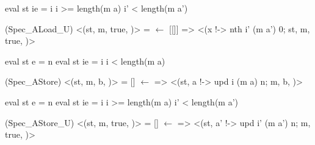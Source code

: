 \documentclass[12pt]{report}
\begin{document}
eval st ie = i   i >= length(m a)   i' < length(m a')
\par
\noindent\hrulefill\par
\noindent{} (Spec\_ALoad\_U)
  <(st, m, true,   )> =  \ensuremath{\leftarrow} [[]] =>
  <(x !-> nth i' (m a') 0; st, m, true,   )>


 eval st e = n    eval st ie = i    i < length(m a)
\par
\noindent\hrulefill\par
\noindent{} (Spec\_AStore)
    <(st, m, b, )> = [] \ensuremath{\leftarrow}  =>
    <(st, a !-> upd i (m a) n; m, b,   )>


        eval st e = n     eval st ie = i
      i >= length(m a)   i' < length(m a')
\par
\noindent\hrulefill\par
\noindent{} (Spec\_AStore\_U)
 <(st, m, true,   )> = [] \ensuremath{\leftarrow}  =>
 <(st, a' !-> upd i' (m a') n; m, true,   )>
\end{document}
